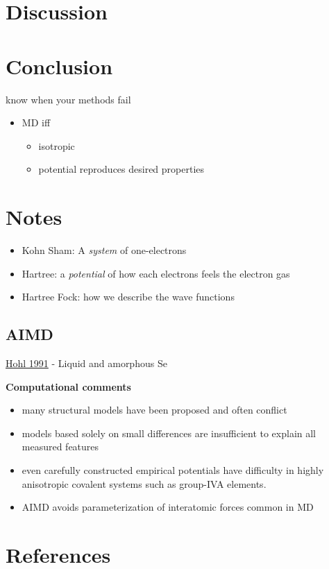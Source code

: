 \documentclass[3p,review,12pt]{elsarticle}
\newcommand{\vs}{\vspace{2mm}}
\begin{document}
\section{Discussion}


\section{Conclusion}
know when your methods fail
\begin{itemize}
	\item MD iff
	\begin{itemize}
		\item isotropic
		\item potential reproduces desired properties
	\end{itemize}
\end{itemize}




\pagebreak

\section*{Notes}

\begin{itemize}
	\item Kohn Sham: A \emph{system} of one-electrons
	\item Hartree: a \emph{potential} of how each electrons feels the electron gas
	\item Hartree Fock: how we describe the wave functions
\end{itemize}
\subsection{AIMD}
\underline{Hohl 1991}\cite{Hohl1991} - Liquid and amorphous Se \par \vs
\textbf{Computational comments}
\begin{itemize}
	\item many structural models have been proposed and often conflict
	\item models based solely on small differences are insufficient to explain all measured features
	\item even carefully constructed empirical potentials have difficulty in highly anisotropic covalent systems such as group-IVA elements.
	\item AIMD avoids parameterization of interatomic forces common in MD
\end{itemize}


\section*{References}



\end{document}
